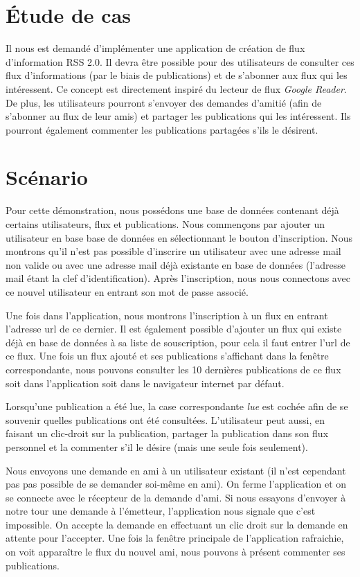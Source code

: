 \documentclass[a4paper,10pt]{article}
\begin{document}
\tableofcontents
\pagebreak

\section{Étude de cas}

Il nous est demandé d'implémenter une application de création de flux d'information RSS 2.0. Il devra être possible pour des utilisateurs de consulter ces flux d'informations (par le biais de publications) et de s'abonner aux flux qui les intéressent. Ce concept est directement inspiré du lecteur de flux \textsl{Google Reader}. De plus, les utilisateurs pourront s'envoyer des demandes d'amitié (afin de s'abonner au flux de leur amis) et partager les publications qui les intéressent. Ils pourront également commenter les publications partagées s'ils le désirent. 

\section{Scénario}

Pour cette démonstration, nous possédons une base de données contenant déjà certains utilisateurs, flux et publications. Nous commençons par ajouter un utilisateur en base base de données en sélectionnant le bouton d'inscription. Nous montrons qu'il n'est pas possible d'inscrire un utilisateur avec une adresse mail non valide ou avec une adresse mail déjà existante en base de données (l'adresse mail étant la clef d'identification). Après l'inscription, nous nous connectons avec ce nouvel utilisateur en entrant son mot de passe associé. 
\

Une fois dans l'application, nous montrons l'inscription à un flux en entrant l'adresse url de ce dernier. Il est également possible d'ajouter un flux qui existe déjà en base de données à sa liste de souscription, pour cela il faut entrer l'url de ce flux. Une fois un flux ajouté et ses publications s'affichant dans la fenêtre correspondante, nous pouvons consulter les 10 dernières publications de ce flux soit dans l'application soit dans le navigateur internet par défaut.
\

Lorsqu'une publication a été lue, la case correspondante \textsl{lue} est cochée afin de se souvenir quelles publications ont été consultées. L'utilisateur peut aussi, en faisant un clic-droit sur la publication, partager la publication dans son flux personnel et la commenter s'il le désire (mais une seule fois seulement).
\

Nous envoyons une demande en ami à un utilisateur existant (il n'est cependant pas pas possible de se demander soi-même en ami). On ferme l'application et on se connecte avec le récepteur de la demande d'ami. Si nous essayons d'envoyer à notre tour une demande à l'émetteur, l'application nous signale que c'est impossible. On accepte la demande en effectuant un clic droit sur la demande en attente pour l'accepter. Une fois la fenêtre principale de l'application rafraichie, on voit apparaître le flux du nouvel ami, nous pouvons à présent commenter ses publications. 
\end{document}
